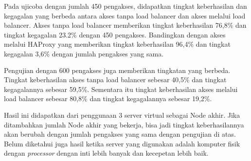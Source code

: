 	Pada ujicoba dengan jumlah 450 pengakses, didapatkan tingkat keberhasilan dan kegagalan yang berbeda antara akses tanpa load balancer dan akses melalui load balancer. Akses tanpa load balancer memberikan tingkat keberhasilan 76,8\% dan tingkat kegagalan 23.2\% dengan 450 pengakses. Bandingkan dengan akses melalui HAProxy yang memberikan tingkat keberhasilan 96,4\% dan tingkat kegagalan 3,6\% dengan jumlah pengakses yang sama.
	
	Pengujian dengan 600 pengakses juga memberikan tingkatan yang berbeda. Tingkat keberhasilan akses tanpa load balancer sebesar 40,5\% dan tingkat kegagalannya sebesar 59,5\%. Sementara itu tingkat keberhasilan akses melalui load balancer sebesar 80,8\% dan tingkat kegagalannya sebesar 19,2\%.
	
	Hasil ini didapatkan dari penggunaan 3 server virtual sebagai Node akhir. Jika ditambahkan jumlah Node akhir yang bekerja, bisa jadi tingkat keberhasilannya akan berubah dengan jumlah pengakses yang sama dengan pengujian di atas. Belum diketahui juga hasil ketika server yang digunakan adalah komputer fisik dengan \textit{processor} dengan inti lebih banyak dan kecepetan lebih baik.

